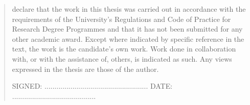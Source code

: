 \documentclass{mimosis-class/mimosis}
\numberwithin{equation}{chapter}
\begin{document}
\label{sec:orge8cb8d4}
\begin{singlespace}
\begin{quote}
 declare that the work in this thesis was carried out in accordance with the requirements of  the University's Regulations and Code of Practice for Research Degree Programmes and that it  has not been submitted for any other academic award. Except where indicated by specific  reference in the text, the work is the candidate's own work. Work done in collaboration with, or with the assistance of, others, is indicated as such. Any views expressed in the thesis are those of the author.

\vspace{1.5cm}
\noindent
\hspace{-0.75cm}\textsc{SIGNED: .................................................... DATE: ..........................................}
\end{quote}
\end{singlespace}
\end{document}
